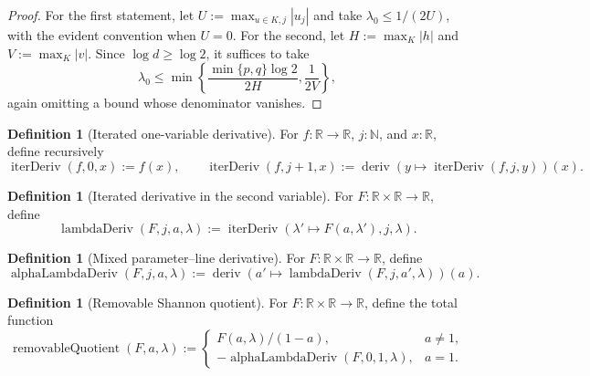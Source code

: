 \documentclass[9pt]{extarticle}
\theoremstyle{definition}
\newtheorem{definition}[lemma]{Definition}
\theoremstyle{remark}
\newcommand{\R}{\mathbb R}
\newcommand{\N}{\mathbb N}
\newcommand{\abs}[1]{\left\lvert #1\right\rvert}
\begin{document}
\begin{proof}
For the first statement, let $U:=\max_{u\in K,j}\abs{u_j}$ and take
$\lambda_0\leq1/(2U)$, with the evident convention when $U=0$. For the
second, let $H:=\max_K\abs h$ and $V:=\max_K\abs v$. Since
$\log d\geq\log2$, it suffices to take
\[
 \lambda_0\leq
 \min\left\{\frac{\min\{p,q\}\log2}{2H},\frac1{2V}\right\},
\]
again omitting a bound whose denominator vanishes.

\end{proof}

\begin{definition}[Iterated one-variable derivative]
\label{def:iterated-deriv}
For $f:\R\to\R$, $j:\N$, and $x:\R$, define recursively
\[
 \operatorname{iterDeriv}(f,0,x):=f(x),\qquad
 \operatorname{iterDeriv}(f,j+1,x):=
 \operatorname{deriv}(y\mapsto\operatorname{iterDeriv}(f,j,y))(x).
\]
\end{definition}

\begin{definition}[Iterated derivative in the second variable]
\label{def:lambda-deriv}
For $F:\R\times\R\to\R$, define
\[
 \operatorname{lambdaDeriv}(F,j,a,\lambda):=
 \operatorname{iterDeriv}(\lambda'\mapsto F(a,\lambda'),j,\lambda).
\]
\end{definition}

\begin{definition}[Mixed parameter--line derivative]
\label{def:alpha-lambda-deriv}
For $F:\R\times\R\to\R$, define
\[
 \operatorname{alphaLambdaDeriv}(F,j,a,\lambda):=
 \operatorname{deriv}
  (a'\mapsto\operatorname{lambdaDeriv}(F,j,a',\lambda))(a).
\]
\end{definition}

\begin{definition}[Removable Shannon quotient]
\label{def:removable-shannon-quotient}
For $F:\R\times\R\to\R$, define the total function
\[
 \operatorname{removableQuotient}(F,a,\lambda):=
 \begin{cases}
 F(a,\lambda)/(1-a),&a\neq1,\\
 -\operatorname{alphaLambdaDeriv}(F,0,1,\lambda),&a=1.
 \end{cases}
\]
\end{definition}
\end{document}
